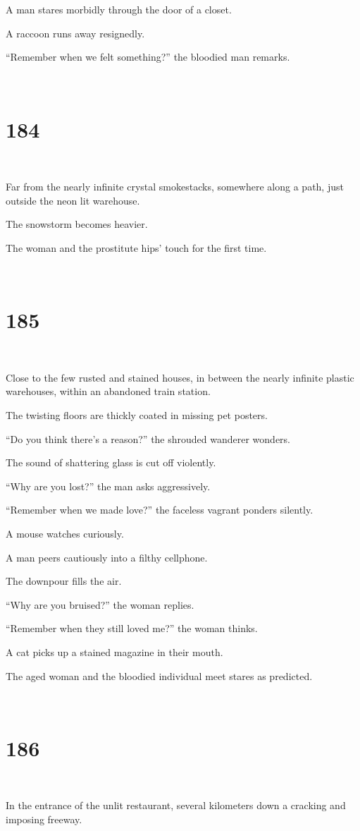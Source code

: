 \documentclass{report}
\begin{document}
A man stares morbidly through the door of a closet.

A raccoon runs away resignedly.

``Remember when we felt something?'' the bloodied man remarks.

~
\chapter*{184}
~

Far from the nearly infinite crystal smokestacks, somewhere along a path, just outside the neon lit warehouse.

The snowstorm becomes heavier.

The woman and the prostitute hips' touch for the first time.

~
\chapter*{185}
~

Close to the few rusted and stained houses, in between the nearly infinite plastic warehouses, within an abandoned train station.

The twisting floors are thickly coated in missing pet posters.

``Do you think there's a reason?'' the shrouded wanderer wonders.

The sound of shattering glass is cut off violently.

``Why are you lost?'' the man asks aggressively.

``Remember when we made love?'' the faceless vagrant ponders silently.

A mouse watches curiously.

A man peers cautiously into a filthy cellphone.

The downpour fills the air.

``Why are you bruised?'' the woman replies.

``Remember when they still loved me?'' the woman thinks.

A cat picks up a stained magazine in their mouth.

The aged woman and the bloodied individual meet stares as predicted.

~
\chapter*{186}
~

In the entrance of the unlit restaurant, several kilometers down a cracking and imposing freeway.
\end{document}
